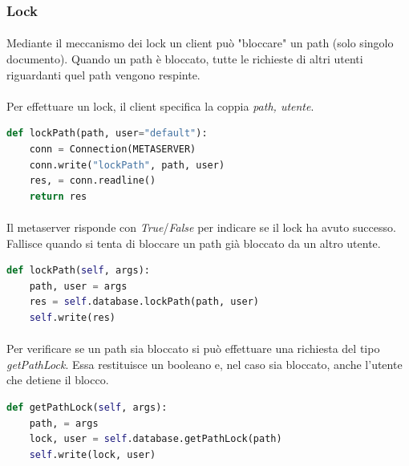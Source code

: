 \documentclass[11pt,a4paper,english]{article}
\begin{document}
\subsubsection{Lock}

\paragraph{} Mediante il meccanismo dei lock un client può "bloccare" un path (solo singolo documento). Quando un path è bloccato, tutte le richieste di altri utenti riguardanti quel path vengono respinte. 

\paragraph{} Per effettuare un lock, il client specifica la coppia \emph{path, utente}. 

\begin{lstlisting}[language=Python, title=Client]
def lockPath(path, user="default"):
    conn = Connection(METASERVER)
    conn.write("lockPath", path, user)
    res, = conn.readline()
    return res
\end{lstlisting}

\paragraph{} Il metaserver risponde con \emph{True}/\emph{False} per indicare se il lock ha avuto successo. Fallisce quando si tenta di bloccare un path già bloccato da un altro utente.

\begin{lstlisting}[language=Python, title=Metaserver]
def lockPath(self, args):
    path, user = args
    res = self.database.lockPath(path, user)
    self.write(res)
\end{lstlisting}

\paragraph{} Per verificare se un path sia bloccato si può effettuare una richiesta del tipo \emph{getPathLock}. Essa restituisce un booleano e, nel caso sia bloccato, anche l'utente che detiene il blocco.

\begin{lstlisting}[language=Python, title=Metaserver]
def getPathLock(self, args):
    path, = args
    lock, user = self.database.getPathLock(path)
    self.write(lock, user)
\end{lstlisting}
\end{document}
